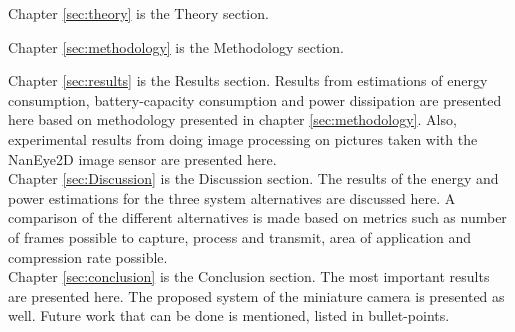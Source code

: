 Chapter \ref{sec:theory} is the Theory section. 


Chapter \ref{sec:methodology} is the Methodology section. 


Chapter \ref{sec:results} is the Results section. Results from estimations of energy consumption, battery-capacity consumption and power dissipation are presented here based on methodology presented in chapter \ref{sec:methodology}. Also, experimental results from doing image processing on pictures taken with the NanEye2D image sensor are presented here. 
\\

Chapter \ref{sec:Discussion} is the Discussion section. The results of the energy and power estimations for the three system alternatives are discussed here. A comparison of the different alternatives is made based on metrics such as number of frames possible to capture, process and transmit, area of application and compression rate possible. 
\\

Chapter \ref{sec:conclusion} is the Conclusion section. The most important results are presented here. The proposed system of the miniature camera is presented as well. Future work that can be done is mentioned, listed in bullet-points. 
\\




